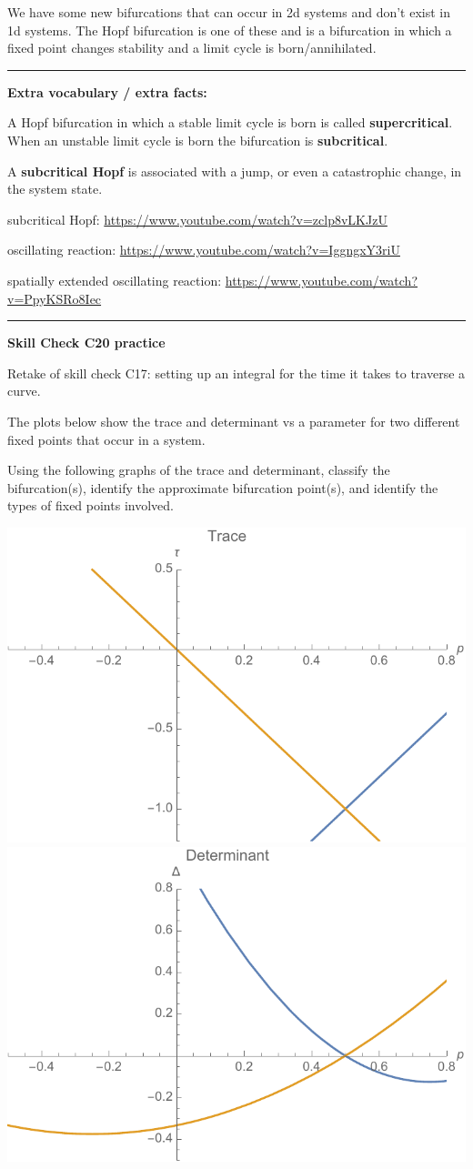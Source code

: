 \documentclass[12pt,letterpaper,noanswers]{exam}
\begin{document}
We have some new bifurcations that can occur in 2d systems and don't exist in 1d systems.  The Hopf bifurcation is one of these and is a bifurcation in which a fixed point changes stability and a limit cycle is born/annihilated.  


\vspace{0.2cm}
\hrule
\vspace{0.2cm}

\noindent \textbf{Extra vocabulary / extra facts:}
\begin{tcolorbox}
A Hopf bifurcation in which a stable limit cycle is born is called \textbf{supercritical}.  When an unstable limit cycle is born the bifurcation is \textbf{subcritical}.  

A \textbf{subcritical Hopf} is associated with a jump, or even a catastrophic change, in the system state.
\end{tcolorbox}

subcritical Hopf:
\url{https://www.youtube.com/watch?v=zclp8vLKJzU}

oscillating reaction:
\url{https://www.youtube.com/watch?v=IggngxY3riU}

spatially extended oscillating reaction:
\url{https://www.youtube.com/watch?v=PpyKSRo8Iec}

\vspace{0.2cm}
\hrule
\vspace{0.2cm}


\noindent\textbf{Skill Check C20 practice}
\begin{questions}
\item Retake of skill check C17: setting up an integral for the time it takes to traverse a curve.


\item The plots below show the trace and determinant vs a parameter for two different fixed points that occur in a system.

Using the following graphs of the trace and determinant, classify the bifurcation(s),  identify the approximate bifurcation point(s), and identify the types of fixed points involved.

\includegraphics[width=0.4\linewidth]{img/C19-20p1a.pdf}
\includegraphics[width=0.4\linewidth]{img/C19-20p1b.pdf}

\end{questions}
\end{document}
